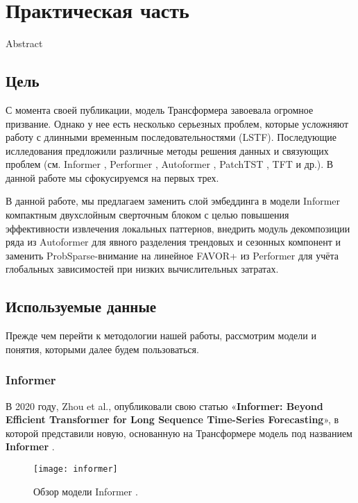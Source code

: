 \section{Практическая часть}

{\color{red} Abstract}

\subsection{Цель}

С момента своей публикации, модель Трансформера \cite{vaswani2017attention}
завоевала огромное призвание. Однако у нее есть несколько серьезных 
проблем, которые усложняют работу с длинными временным последовательностями 
(LSTF). Последующие ислледования предложили различные методы решения 
данных и связующих проблем (см. Informer \cite{informer}, Performer \cite{performer}, 
Autoformer \cite{autoformer}, PatchTST \cite{patchTST}, TFT \cite{TFT} и др.). 
В данной работе мы сфокусируемся на первых трех.

В данной работе, мы предлагаем заменить слой эмбеддинга в модели 
Informer компактным двухслойным сверточным блоком с целью повышения 
эффективности извлечения локальных паттернов, внедрить модуль 
декомпозиции ряда из Autoformer для явного разделения 
трендовых и сезонных компонент и заменить ProbSparse-внимание 
на линейное FAVOR+ из Performer для учёта глобальных 
зависимостей при низких вычислительных затратах.

\subsection{Используемые данные}

Прежде чем перейти к методологии нашей работы, рассмотрим 
модели и понятия, которыми далее будем пользоваться.

\subsubsection{Informer}

В 2020 году, Zhou et al., опубликовали свою статью 
«\textbf{Informer: Beyond Efficient Transformer for 
Long Sequence Time-Series Forecasting}», в которой 
представили новую, основанную на Трансформере \cite{vaswani2017attention} 
модель под названием \textbf{Informer} \cite{informer}. 

\begin{figure}[h!]
    \centering
    \texttt{[image: informer]}
    \caption{Обзор модели Informer \cite{informer}.}
    \label{fig:informer}
\end{figure}

